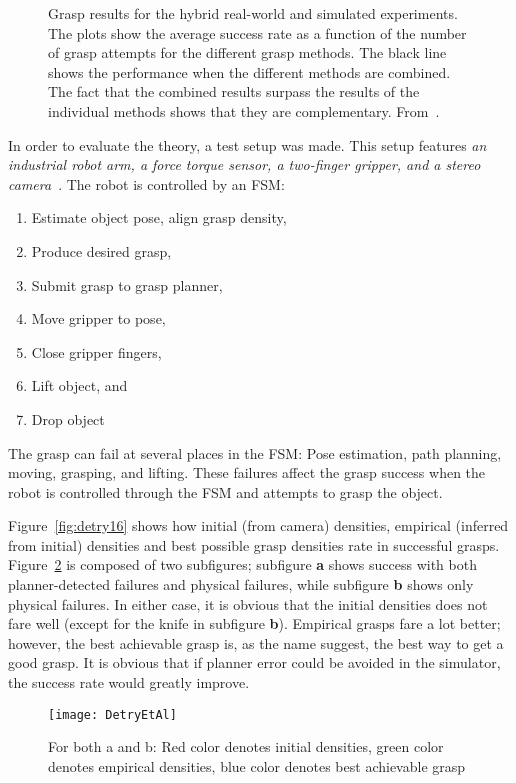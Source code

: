 \begin{figure}
	\centering
	\caption{Grasp results for the hybrid real-world and simulated experiments. The plots show the average success rate as a function of the number of grasp attempts for the different grasp methods. The black line shows the performance when the different methods are combined. The fact that the combined results surpass the results of the individual methods shows that they are complementary. From~\cite{kootstra}.}
	\label{fig:kootstra21}
\end{figure}
 
In order to evaluate the theory, a test setup was made. This setup features \emph{an industrial robot arm, a force torque sensor, a two-finger gripper, and a stereo camera}~\cite{detry}. 
The robot is controlled by an FSM:
\begin{enumerate}
	\item Estimate object pose, align grasp density,
	\item Produce desired grasp,
	\item Submit grasp to grasp planner,
	\item Move gripper to pose,
	\item Close gripper fingers,
	\item Lift object, and
	\item Drop object
\end{enumerate}
 
The grasp can fail at several places in the FSM: Pose estimation, path planning, moving, grasping, and lifting. 
These failures affect the grasp success when the robot is controlled through the FSM and attempts to grasp the object.

Figure~\vref{fig:detry16} shows how initial (from camera) densities, empirical (inferred from initial) densities and best possible grasp densities rate in successful grasps.
Figure~\ref{fig:detry16} is composed of two subfigures; subfigure \textbf{a} shows success with both planner-detected failures and physical failures,
while subfigure \textbf{b} shows only physical failures. 
In either case, it is obvious that the initial densities does not fare well (except for the knife in subfigure \textbf{b}). 
Empirical grasps fare a lot better; however, the best achievable grasp is, as the name suggest, the best way to get a good grasp. 
It is obvious that if planner error could be avoided in the simulator, the success rate would greatly improve.
 
\begin{figure}
	\centering
	\texttt{[image: DetryEtAl]}
	\caption{For both a and b: Red color denotes initial densities, green color denotes empirical densities, blue color denotes best achievable grasp}
	\label{fig:detry16}
\end{figure}